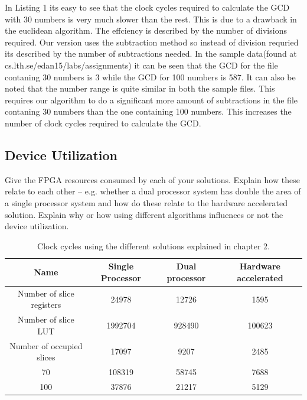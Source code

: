 \documentclass[11pt]{article}
\begin{document}
In Listing 1 its easy to see that the clock cycles required to calculate the GCD with 30 numbers is very much slower than the rest. This is due to a drawback in the euclidean algorithm. The effciency is described by the number of divisions required. Our version uses the subtraction method so instead of division requried its described by the number of subtractions needed. In the sample data(found at cs.lth.se/edan15/labs/assignments) it can be seen that the GCD for the file contaning 30 numbers is 3 while the GCD for 100 numbers is 587. It can also be noted that the number range is quite similar in both the sample files. This requires our algorithm to do a significant more amount of subtractions in the file contaning 30 numbers than the one containing 100 numbers. This increases the number of clock cycles required to calculate the GCD.




\subsection{Device Utilization}
Give the FPGA resources consumed by each of your solutions. Explain how these relate to each other -- e.g. whether a dual processor system has double the area of a single processor system and how do these relate to the hardware accelerated solution. Explain why or how using different algorithms influences or not the device utilization.


\begin{table}[htbp]
   \centering
   \begin{tabular}{@{} cccc @{}} %
      \toprule
      \cmidrule(r){1-2} %
	Name	& Single Processor	& Dual processor	& Hardware accelerated\\
      \midrule
      Number of slice registers	& 24978			& 12726			&1595\\
      Number of slice LUT	& 1992704		&  928490		&100623\\
      Number of occupied slices	& 17097			& 9207			&2485\\
      70	& 108319		& 58745			&7688\\
     100	& 37876			&  21217		&5129\\
      \bottomrule
   \end{tabular}
   \caption{Clock cycles using the different solutions explained in chapter 2.}
   \label{tab:Utilization}
\end{table}
\end{document}
